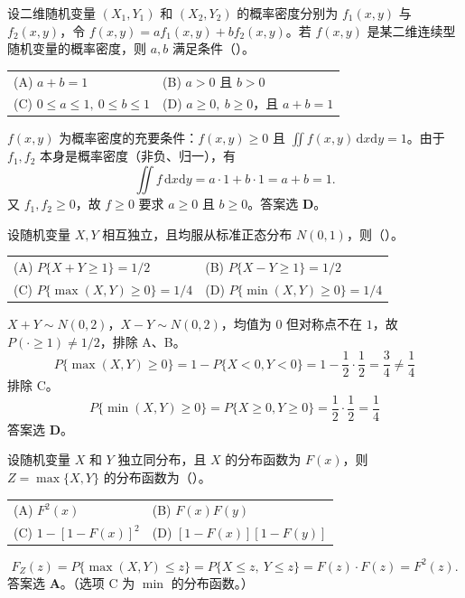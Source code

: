 \documentclass[lang=cn,11pt]{elegantbook}
\begin{document}
\begin{exercise}[密度函数线性组合] \label{exer:3-c1}
设二维随机变量 $(X_1,Y_1)$ 和 $(X_2,Y_2)$ 的概率密度分别为 $f_1(x,y)$ 与 $f_2(x,y)$，令 $f(x,y) = af_1(x,y) + bf_2(x,y)$。若 $f(x,y)$ 是某二维连续型随机变量的概率密度，则 $a, b$ 满足条件（\quad）。
\begin{tabular}{ll}
(A) $a+b=1$ & (B) $a>0$ 且 $b>0$ \\
(C) $0\leqslant a\leqslant 1,\ 0\leqslant b\leqslant 1$ & (D) $a\geqslant 0,\ b\geqslant 0$，且 $a+b=1$
\end{tabular}
\end{exercise}
\begin{solution}
$f(x,y)$ 为概率密度的充要条件：$f(x,y) \geqslant 0$ 且 $\displaystyle\iint f(x,y)\,\mathrm{d}x\mathrm{d}y = 1$。由于 $f_1, f_2$ 本身是概率密度（非负、归一），有
\[
\iint f\,\mathrm{d}x\mathrm{d}y = a\cdot 1 + b\cdot 1 = a + b = 1.
\]
又 $f_1, f_2 \geqslant 0$，故 $f \geqslant 0$ 要求 $a \geqslant 0$ 且 $b \geqslant 0$。答案选 \textbf{D}。
\end{solution}

\begin{exercise}[标准正态独立随机变量] \label{exer:3-c2}
设随机变量 $X, Y$ 相互独立，且均服从标准正态分布 $N(0,1)$，则（\quad）。
\begin{tabular}{ll}
(A) $P\{X+Y \geqslant 1\} = 1/2$ & (B) $P\{X-Y \geqslant 1\} = 1/2$ \\
(C) $P\{\max(X,Y) \geqslant 0\} = 1/4$ & (D) $P\{\min(X,Y) \geqslant 0\} = 1/4$
\end{tabular}
\end{exercise}
\begin{solution}
$X+Y \sim N(0,2)$，$X-Y \sim N(0,2)$，均值为 $0$ 但对称点不在 $1$，故 $P(\cdot \geqslant 1) \neq 1/2$，排除 A、B。
\[P\{\max(X,Y) \geqslant 0\} = 1 - P\{X < 0, Y < 0\} = 1 - \frac{1}{2}\cdot\frac{1}{2} = \frac{3}{4} \neq \frac{1}{4}\]排除 C。
\[P\{\min(X,Y) \geqslant 0\} = P\{X \geqslant 0, Y \geqslant 0\} = \frac{1}{2}\cdot\frac{1}{2} = \frac{1}{4}\]
答案选 \textbf{D}。
\end{solution}



\begin{exercise} \label{exer:3-c3}
设随机变量 $X$ 和 $Y$ 独立同分布，且 $X$ 的分布函数为 $F(x)$，则 $Z = \max\{X,Y\}$ 的分布函数为（\quad）。
\begin{tabular}{ll}
(A) $F^2(x)$ & (B) $F(x)F(y)$ \\
(C) $1-[1-F(x)]^2$ & (D) $[1-F(x)][1-F(y)]$
\end{tabular}
\end{exercise}
\begin{solution}
\[
F_Z(z) = P\{\max(X,Y) \leqslant z\} = P\{X \leqslant z,\ Y \leqslant z\} = F(z) \cdot F(z) = F^2(z).
\]
答案选 \textbf{A}。（选项 C 为 $\min$ 的分布函数。）
\end{solution}
\end{document}
